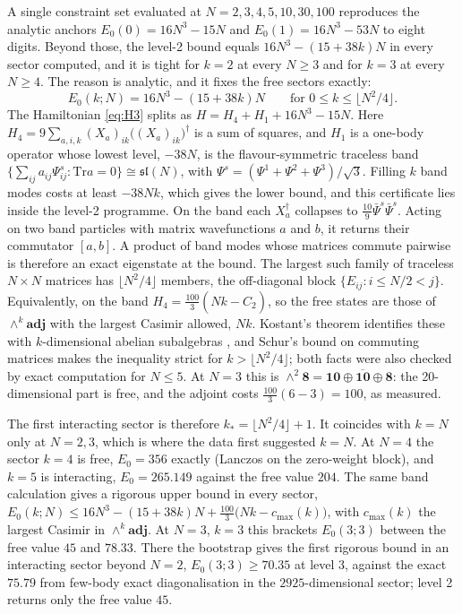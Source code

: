 \documentclass[10pt]{article}
\newcommand{\Tr}{\mathrm{Tr}}
\newcommand{\bPsi}{\bar\Psi}
\begin{document}
A single constraint set evaluated at $N=2,3,4,5,10,30,100$ reproduces the analytic anchors
$E_0(0)=16N^3-15N$ and $E_0(1)=16N^3-53N$ to eight digits. Beyond those, the level-2 bound equals
$16N^3-(15+38k)N$ in every sector computed, and it is tight for $k=2$ at every $N\ge3$ and for $k=3$ at every
$N\ge4$. The reason is analytic, and it fixes the free sectors exactly:
\begin{equation}
E_0(k;N)=16N^3-(15+38k)N\qquad\text{for }0\le k\le\lfloor N^2/4\rfloor .
\label{eq:free}
\end{equation}
The Hamiltonian \eqref{eq:H3} splits as $H=H_4+H_1+16N^3-15N$. Here
$H_4=9\sum_{a,i,k}(X_a)_{ik}\big((X_a)_{ik}\big)^\dagger$ is a sum of squares, and $H_1$ is a one-body operator
whose lowest level, $-38N$, is the flavour-symmetric traceless band
$\{\sum_{ij}a_{ij}\Psi^s_{ij}:\Tr a=0\}\cong\mathfrak{sl}(N)$, with $\Psi^s=(\Psi^1+\Psi^2+\Psi^3)/\sqrt3$. Filling $k$
band modes costs at least $-38Nk$, which gives the lower bound, and this certificate lies inside the level-2
programme. On the band each $X_a^\dagger$ collapses to $\frac{10}9\bPsi^s\bPsi^s$. Acting on two band particles
with matrix wavefunctions $a$ and $b$, it returns their commutator $[a,b]$. A product of band modes whose matrices
commute pairwise is therefore an exact eigenstate at the bound. The largest such family of traceless
$N\times N$ matrices has $\lfloor N^2/4\rfloor$ members, the off-diagonal block $\{E_{ij}:i\le N/2<j\}$.
Equivalently, on the band $H_4=\frac{100}3(Nk-\hat C_2)$, so the free states are those of $\wedge^k\mathbf{adj}$
with the largest Casimir allowed, $Nk$. Kostant's theorem identifies these with $k$-dimensional abelian
subalgebras \cite{Kostant}, and Schur's bound on commuting matrices \cite{Schur} makes the inequality strict for
$k>\lfloor N^2/4\rfloor$; both facts were also checked by exact computation for $N\le5$. At $N=3$ this is
$\wedge^2\mathbf 8=\mathbf{10}\oplus\overline{\mathbf{10}}\oplus\mathbf 8$: the 20-dimensional part is free, and the
adjoint costs $\frac{100}3(6-3)=100$, as measured.

The first interacting sector is therefore $k_*=\lfloor N^2/4\rfloor+1$. It coincides with $k=N$ only at $N=2,3$,
which is where the data first suggested $k=N$. At $N=4$ the sector $k=4$ is free, $E_0=356$ exactly (Lanczos on
the zero-weight block), and $k=5$ is interacting, $E_0=265.149$ against the free value $204$. The same band
calculation gives a rigorous upper bound in every sector,
$E_0(k;N)\le16N^3-(15+38k)N+\frac{100}3\big(Nk-c_{\max}(k)\big)$, with $c_{\max}(k)$ the largest Casimir in
$\wedge^k\mathbf{adj}$. At $N=3$, $k=3$ this brackets $E_0(3;3)$ between the free value $45$ and $78.33$. There the
bootstrap gives the first rigorous bound in an interacting sector beyond $N=2$, $E_0(3;3)\ge70.35$ at level 3,
against the exact $75.79$ from few-body exact diagonalisation in the $2925$-dimensional sector; level 2 returns
only the free value $45$.
\end{document}
